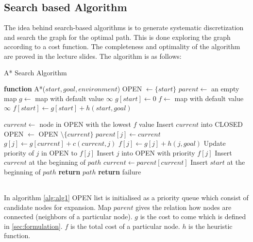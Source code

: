 \documentclass[conference]{IEEEtran}
\begin{document}
\subsection{Search based Algorithm}
The idea behind search-based algorithms is to generate systematic discretization and search the graph for the optimal path. This is done 
exploring the graph according to a cost function. The completeness and optimality of the algorithm are proved in the lecture slides.
The algorithm is as follows:
\begin{algorithm} \label{alg:alg1}
    \caption{A* Search Algorithm}
\begin{algorithmic}
    \STATE \textbf{function} A*($start, goal, environment$)
    \STATE OPEN $\leftarrow \{start\}$
    \STATE $parent \leftarrow$ an empty map
    \STATE $g \leftarrow$ map with default value $\infty$
    \STATE $g[start] \leftarrow 0$
    \STATE $f \leftarrow$ map with default value $\infty$
    \STATE $f[start] \leftarrow g[start] + h(start, goal)$
    
        \STATE $current \leftarrow$ node in OPEN with the lowest $f$ value
        \STATE Insert $current$ into CLOSED
        \STATE OPEN $\leftarrow$ OPEN $\setminus \{current\}$
                \STATE $parent[j] \leftarrow current$
                \STATE $g[j] \leftarrow g[current] + c(current, j)$
                \STATE $f[j] \leftarrow g[j] + h(j, goal)$
                    \STATE Update priority of $j$ in OPEN to $f[j]$
                \ELSE
                    \STATE Insert $j$ into OPEN with priority $f[j]$
                \ENDIF
            \ENDIF
        \ENDFOR
    \ENDWHILE
            \STATE Insert $current$ at the beginning of $path$
            \STATE $current \leftarrow parent[current]$
        \ENDWHILE
        \STATE Insert $start$ at the beginning of $path$
        \STATE \textbf{return} $path$
    \ENDIF
    \STATE \textbf{return} failure
    \end{algorithmic}
\end{algorithm} \\
In algorithm \ref{alg:alg1} OPEN list is initialised as a priority queue which consist of candidate nodes for expansion. Map $parent$ gives the relation how nodes are connected (neighbors of a particular node).
$g$ is the cost to come which is defined in \ref{sec:formulation}. $f$ is the total cost of a particular node. $h$ is the heuristic function.
\end{document}
